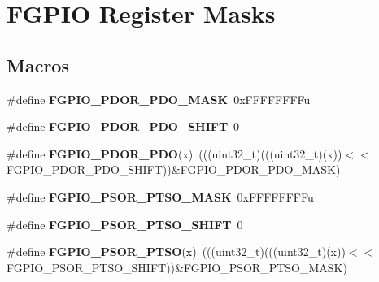 \hypertarget{group___f_g_p_i_o___register___masks}{}\section{F\+G\+P\+IO Register Masks}
\label{group___f_g_p_i_o___register___masks}
\subsection*{Macros}
\begin{DoxyCompactItemize}
\item 
\mbox{\label{group___f_g_p_i_o___register___masks_ga36d3575737128f82053b0b713c2ba12c}} 
\#define {\bfseries F\+G\+P\+I\+O\+\_\+\+P\+D\+O\+R\+\_\+\+P\+D\+O\+\_\+\+M\+A\+SK}~0x\+F\+F\+F\+F\+F\+F\+F\+Fu
\item 
\mbox{\label{group___f_g_p_i_o___register___masks_gac47066e363d078fd698fccc3e2717b7e}} 
\#define {\bfseries F\+G\+P\+I\+O\+\_\+\+P\+D\+O\+R\+\_\+\+P\+D\+O\+\_\+\+S\+H\+I\+FT}~0
\item 
\mbox{\label{group___f_g_p_i_o___register___masks_gafab743986cbbf8fdbf9ed322104e413d}} 
\#define {\bfseries F\+G\+P\+I\+O\+\_\+\+P\+D\+O\+R\+\_\+\+P\+DO}(x)~(((uint32\+\_\+t)(((uint32\+\_\+t)(x))$<$$<$F\+G\+P\+I\+O\+\_\+\+P\+D\+O\+R\+\_\+\+P\+D\+O\+\_\+\+S\+H\+I\+FT))\&F\+G\+P\+I\+O\+\_\+\+P\+D\+O\+R\+\_\+\+P\+D\+O\+\_\+\+M\+A\+SK)
\item 
\mbox{\label{group___f_g_p_i_o___register___masks_gae9ca2771800b24b305bfa09312e2ee3e}} 
\#define {\bfseries F\+G\+P\+I\+O\+\_\+\+P\+S\+O\+R\+\_\+\+P\+T\+S\+O\+\_\+\+M\+A\+SK}~0x\+F\+F\+F\+F\+F\+F\+F\+Fu
\item 
\mbox{\label{group___f_g_p_i_o___register___masks_ga8a5cd9350700e90d57dfc2d6b27f9184}} 
\#define {\bfseries F\+G\+P\+I\+O\+\_\+\+P\+S\+O\+R\+\_\+\+P\+T\+S\+O\+\_\+\+S\+H\+I\+FT}~0
\item 
\mbox{\label{group___f_g_p_i_o___register___masks_gab91ddcf26e7cb532e95e1aadef87b8a9}} 
\#define {\bfseries F\+G\+P\+I\+O\+\_\+\+P\+S\+O\+R\+\_\+\+P\+T\+SO}(x)~(((uint32\+\_\+t)(((uint32\+\_\+t)(x))$<$$<$F\+G\+P\+I\+O\+\_\+\+P\+S\+O\+R\+\_\+\+P\+T\+S\+O\+\_\+\+S\+H\+I\+FT))\&F\+G\+P\+I\+O\+\_\+\+P\+S\+O\+R\+\_\+\+P\+T\+S\+O\+\_\+\+M\+A\+SK)

\end{DoxyCompactItemize}
